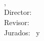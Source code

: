 \begin{titlepage}
	\thesisDate \\

\end{titlepage}


\hfill
\vfill
{
	\small
	\textbf{\thesisName} \\
	\textit{\thesisTitle} \\
	\thesisSubject, \thesisDate \\
	Director: \thesisFirstReviewer \\
	Revisor: \thesisSecondReviewer \\
	Jurados: \thesisFirstSupervisor\ y \thesisSecondSupervisor \\[1.5em]
	\textbf{\thesisUniversity} \\
	\textit{\thesisUniversityGroup} \\
	\thesisUniversityInstitute \\
	\thesisUniversityDepartment \\
	\thesisUniversityStreetAddress \\
	\thesisUniversityCity \\
	\thesisUniversityPostalCode
}